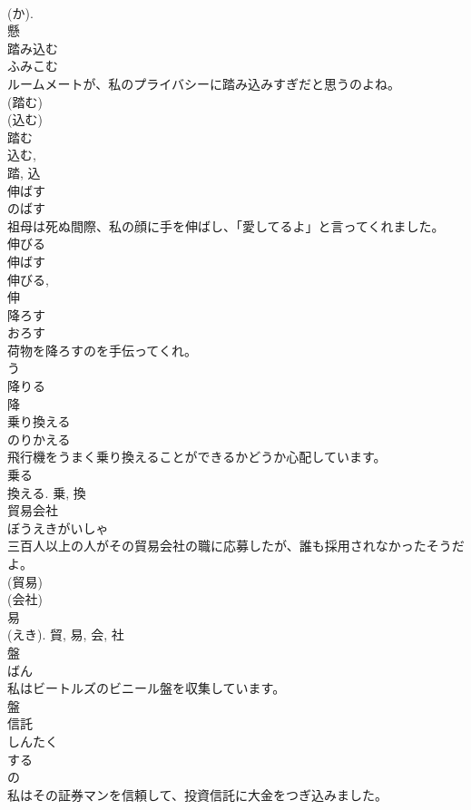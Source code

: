 \documentclass[8pt]{extreport}
\begin{document}
\begin{CJK}{UTF8}{min}
\\	(か). 
\\	懸	
\\	踏み込む	
\\	ふみこむ	
\\	ルームメートが、私のプライバシーに踏み込みすぎだと思うのよね。	
\\	(踏む) 
\\	(込む) 
\\	踏む 
\\	込む, 
\\	踏, 込	
\\	伸ばす	
\\	のばす	
\\	祖母は死ぬ間際、私の顔に手を伸ばし、「愛してるよ」と言ってくれました。	
\\	伸びる 
\\	伸ばす 
\\	伸びる, 
\\	伸	
\\	降ろす	
\\	おろす	
\\	荷物を降ろすのを手伝ってくれ。	
\\	う 
\\	降りる 
\\	降	
\\	乗り換える	
\\	のりかえる	
\\	飛行機をうまく乗り換えることができるかどうか心配しています。	
\\	乗る 
\\	換える.	乗, 換	
\\	貿易会社	
\\	ぼうえきがいしゃ	
\\	三百人以上の人がその貿易会社の職に応募したが、誰も採用されなかったそうだよ。	
\\	(貿易) 
\\	(会社) 
\\	易 
\\	(えき).	貿, 易, 会, 社	
\\	盤	
\\	ばん	
\\	私はビートルズのビニール盤を収集しています。	
\\	盤	
\\	信託	
\\	しんたく	
\\	する 
\\	の 
\\	私はその証券マンを信頼して、投資信託に大金をつぎ込みました。	

\end{CJK}
\end{document}
